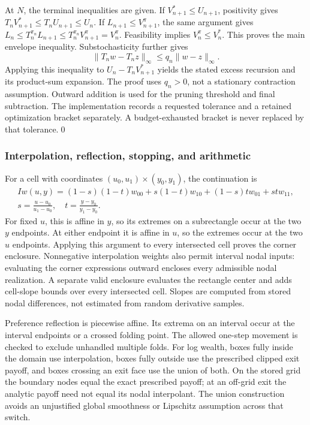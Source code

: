 \documentclass[ecta,nameyear,draft]{econsocart}
\theoremstyle{definition}
\theoremstyle{remark}
\begin{document}
At $N$, the terminal inequalities are given. If $V_{n+1}^*\leq U_{n+1}$, positivity gives $T_nV_{n+1}^*\leq T_nU_{n+1}\leq U_n$. If $L_{n+1}\leq V_{n+1}^{\pi}$, the same argument gives $L_n\leq T_n^{\pi_n}L_{n+1}\leq T_n^{\pi_n}V_{n+1}^{\pi}=V_n^{\pi}$. Feasibility implies $V_n^{\pi}\leq V_n^*$. This proves the main envelope inequality. Substochasticity further gives
\[
 \|T_nw-T_nz\|_\infty\leq q_n\|w-z\|_\infty.
\]
Applying this inequality to $U_n-T_nV_{n+1}^*$ yields the stated excess recursion and its product-sum expansion. The proof uses $q_n>0$, not a stationary contraction assumption. Outward addition is used for the pruning threshold and final subtraction. The implementation records a requested tolerance and a retained optimization bracket separately. A budget-exhausted bracket is never replaced by that tolerance.\qed

\subsubsection{Interpolation, reflection, stopping, and arithmetic}
For a cell with coordinates $(u_0,u_1)\times(y_0,y_1)$, the continuation is
\[
 \begin{gathered}
 Iw(u,y)=(1-s)(1-t)w_{00}+s(1-t)w_{10}+(1-s)tw_{01}+st w_{11},\\
 s=\frac{u-u_0}{u_1-u_0},\quad t=\frac{y-y_0}{y_1-y_0}.
\end{gathered}
\]
For fixed $u$, this is affine in $y$, so its extremes on a subrectangle occur at the two $y$ endpoints. At either endpoint it is affine in $u$, so the extremes occur at the two $u$ endpoints. Applying this argument to every intersected cell proves the corner enclosure. Nonnegative interpolation weights also permit interval nodal inputs: evaluating the corner expressions outward encloses every admissible nodal realization. A separate valid enclosure evaluates the rectangle center and adds cell-slope bounds over every intersected cell. Slopes are computed from stored nodal differences, not estimated from random derivative samples.

Preference reflection is piecewise affine. Its extrema on an interval occur at the interval endpoints or a crossed folding point. The allowed one-step movement is checked to exclude unhandled multiple folds. For log wealth, boxes fully inside the domain use interpolation, boxes fully outside use the prescribed clipped exit payoff, and boxes crossing an exit face use the union of both. On the stored grid the boundary nodes equal the exact prescribed payoff; at an off-grid exit the analytic payoff need not equal its nodal interpolant. The union construction avoids an unjustified global smoothness or Lipschitz assumption across that switch.
\end{document}

